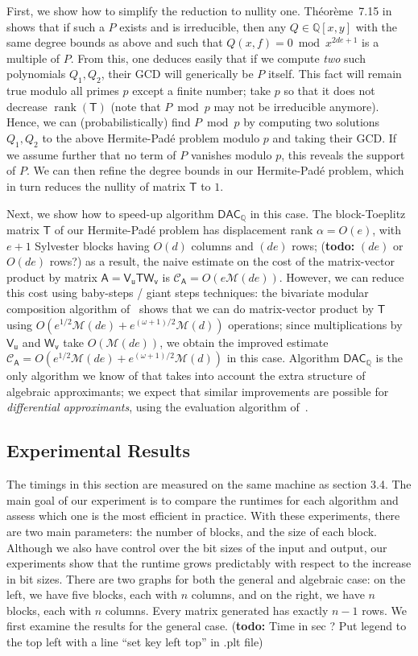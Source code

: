 \documentclass[sigconf]{acmart}
\newcommand{\vu}{\ensuremath{\mathsf{u}}}
\newcommand{\vv}{\ensuremath{\mathsf{v}}}
\newcommand{\mA}{\ensuremath{\mathsf{A}}}
\newcommand{\mT}{\ensuremath{\mathsf{T}}}
\newcommand{\mV}{\ensuremath{\mathsf{V}}}
\newcommand{\mW}{\ensuremath{\mathsf{W}}}
\newcommand{\Q}{\ensuremath{\mathbb{Q}}}
\newcommand{\M}{\ensuremath{\mathscr{M}}}
\newcommand{\CA}{\ensuremath{\mathscr{C}_\mA}}
\newcommand{\rank}{\ensuremath{\operatorname{rank}}}
\newcommand{\DACQ}{\ensuremath{\mathsf{DAC}_\Q}}
\newcommand{\todo}[1]{(\textbf{todo:} #1)}
\theoremstyle{acmdefinition}
\begin{document}
First, we show how to simplify the reduction to nullity one.
Th\'eo\-r\`eme~7.15 in~\cite{BoChGiLeLeSaSc17} shows that if such a
$P$ exists and is irreducible, then any $Q \in \Q[x,y]$ with the same
degree bounds as above and such that $Q(x,f) = 0 \bmod x^{2de+1}$ is a
multiple of $P$.  From this, one deduces easily that if we compute
\emph{two} such polynomials $Q_1,Q_2$, their GCD will generically be
$P$ itself. This fact will remain true modulo all primes $p$ except a
finite number; take $p$ so that it does not decrease $\rank(\mT)$
(note that $P \bmod p$ may not be irreducible anymore). Hence, we can
(probabilistically) find $P \bmod p$ by computing two solutions
$Q_1,Q_2$ to the above Hermite-Pad\'e problem modulo $p$ and taking
their GCD. If we assume further that no term of $P$ vanishes modulo
$p$, this reveals the support of $P$. We can then refine the degree
bounds in our Hermite-Pad\'e problem, which in turn reduces the
nullity of matrix $\mT$ to $1$.

Next, we show how to speed-up algorithm $\DACQ$ in this case. The
block-Toeplitz matrix $\mT$ of our Hermite-Pad\'e problem has
displacement rank $\alpha = O(e)$, with $e+1$ Sylvester blocks having
$O(d)$ columns and $(de)$ rows; 
%
\todo{$(de)$ or $O(de)$ rows?}
%
as a result, the naive estimate on the
cost of the matrix-vector product by matrix $\mA = \mV_\vu \mT
\mW_\vv$ is $\CA=O(e \M(de))$. However, we can reduce this cost using
baby-steps / giant steps techniques: the bivariate modular composition
algorithm of~\cite{NuZi04} shows that we can do matrix-vector product
by $\mT$ using $O(e^{1/2} \M(de) + e^{(\omega+1)/2} \M(d))$
operations; since multiplications by $\mV_\vu$ and $\mW_\vv$ take
$O(\M(de))$, we obtain the improved estimate $\CA=O(e^{1/2} \M(de) +
e^{(\omega+1)/2} \M(d))$ in this case. Algorithm $\DACQ$ is the only
algorithm we know of that  takes into account the extra structure of
algebraic approximants; we expect that similar improvements are
possible for {\em differential approximants}, using the evaluation
algorithm of~\cite{BoSc09}.

\vspace{-5px}
\subsection{Experimental Results}
The timings in this section are measured on the same machine as
section 3.4. The main goal of our experiment is to compare the
runtimes for each algorithm and assess which one is the most efficient
in practice. With these experiments, there are two main parameters:
the number of blocks, and the size of each block. Although we also
have control over the bit sizes of the input and output, our
experiments show that the runtime grows predictably with respect to the
increase in bit sizes. There are two graphs for both the general and
algebraic case: on the left, we have five blocks, each with $n$
columns, and on the right, we have $n$ blocks, each with $n$ columns. 
Every matrix generated has exactly $n-1$
rows. We first examine the results for the general case.
\todo{Time in sec ? 
Put legend to the top left with a line ``set key left top'' in .plt file}
\end{document}
